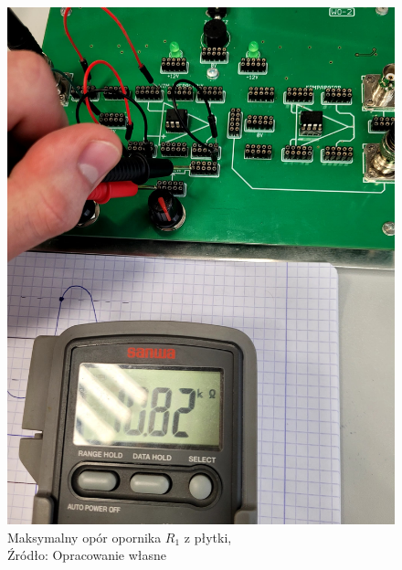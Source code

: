 \documentclass{article}
\begin{document}
    \begin{figure}[!ht]
      \begin{minipage}{.5\textwidth}
          \centering
          \includegraphics[scale=0.08]{grafiki/r_max.jpg}
          \caption{Maksymalny opór opornika $R_1$ z płytki,
          \\Źródło: Opracowanie własne}
      \end{minipage}
      \begin{minipage}{.5\textwidth}
          \centering

\end{minipage}
\end{figure}
\end{document}
